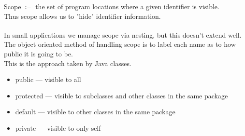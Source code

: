 \documentclass[../../lecture_notes.tex]{subfiles}
\begin{document}
Scope $\coloneqq$ the set of program locations where a given identifier is visible.\\
Thus scope allows us to "hide" identifier information.\\
\\
In small applications we manage scope via nesting, but this doesn’t extend well.\\
The object oriented method of handling scope is to label each name as to how public it is going to be.\\
	This is the approach taken by Java classes. \begin{itemize} [itemsep=0mm]
		\item public — visible to all
		\item protected — visible to subclasses and other classes in the same package
		\item default — visible to other classes in the same package
		\item private — visible to only self
	\end{itemize}
\end{document}
